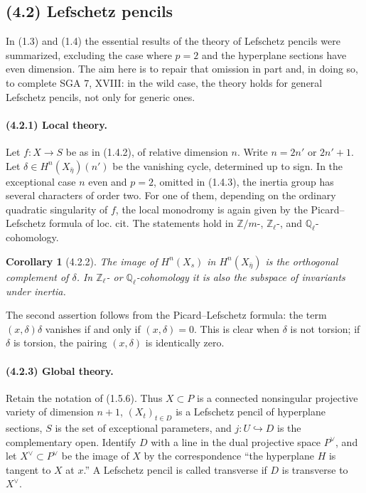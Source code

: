 \documentclass[11pt]{article}
\newtheorem{corollary}{Corollary}
\theoremstyle{remark}
\begin{document}
\subsection*{(4.2) Lefschetz pencils}

In (1.3) and (1.4) the essential results of the theory of Lefschetz pencils were summarized, excluding the case where $p=2$ and the hyperplane sections have even dimension. The aim here is to repair that omission in part and, in doing so, to complete SGA 7, XVIII: in the wild case, the theory holds for general Lefschetz pencils, not only for generic ones.

\paragraph{(4.2.1) Local theory.}
Let $f:X\to S$ be as in (1.4.2), of relative dimension $n$. Write $n=2n'$ or $2n'+1$. Let $\delta\in H^n(X_{\bar\eta})(n')$ be the vanishing cycle, determined up to sign. In the exceptional case $n$ even and $p=2$, omitted in (1.4.3), the inertia group has several characters of order two. For one of them, depending on the ordinary quadratic singularity of $f$, the local monodromy is again given by the Picard--Lefschetz formula of loc. cit. The statements hold in $\mathbb Z/m$-, $\mathbb Z_\ell$-, and $\mathbb Q_\ell$-cohomology.

\begin{corollary}[4.2.2]
The image of $H^n(X_s)$ in $H^n(X_{\bar\eta})$ is the orthogonal complement of $\delta$. In $\mathbb Z_\ell$- or $\mathbb Q_\ell$-cohomology it is also the subspace of invariants under inertia.
\end{corollary}

The second assertion follows from the Picard--Lefschetz formula: the term $(x,\delta)\delta$ vanishes if and only if $(x,\delta)=0$. This is clear when $\delta$ is not torsion; if $\delta$ is torsion, the pairing $(x,\delta)$ is identically zero.

\paragraph{(4.2.3) Global theory.}
Retain the notation of (1.5.6). Thus $X\subset P$ is a connected nonsingular projective variety of dimension $n+1$, $(X_t)_{t\in D}$ is a Lefschetz pencil of hyperplane sections, $S$ is the set of exceptional parameters, and $j:U\hookrightarrow D$ is the complementary open. Identify $D$ with a line in the dual projective space $P^\vee$, and let $X^\vee\subset P^\vee$ be the image of $X$ by the correspondence ``the hyperplane $H$ is tangent to $X$ at $x$.'' A Lefschetz pencil is called transverse if $D$ is transverse to $X^\vee$.
\end{document}
